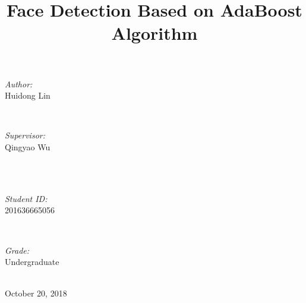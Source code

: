 \documentclass[journal, a4paper]{IEEEtran}
\begin{document}
\begin{titlepage}
\begin{minipage}{0.4\textwidth}
\begin{flushleft} \large
\emph{Author:}\\
Huidong Lin %
\end{flushleft}
\end{minipage}
~
\begin{minipage}{0.4\textwidth}
\begin{flushright} \large
\emph{Supervisor:} \\
Qingyao Wu %
\end{flushright}
\end{minipage}\\[2cm]
~
\begin{minipage}{0.4\textwidth}
\begin{flushleft} \large
\emph{Student ID:}\\
201636665056
\end{flushleft}
\end{minipage}
~
\begin{minipage}{0.4\textwidth}
\begin{flushright} \large
\emph{Grade:} \\
Undergraduate
\end{flushright}
\end{minipage}\\[2cm]



{\large October 20, 2018}\\[2cm] %

 

\vfill %

\end{titlepage}

	\title{Face Detection Based on AdaBoost Algorithm}
	\maketitle
\end{document}
